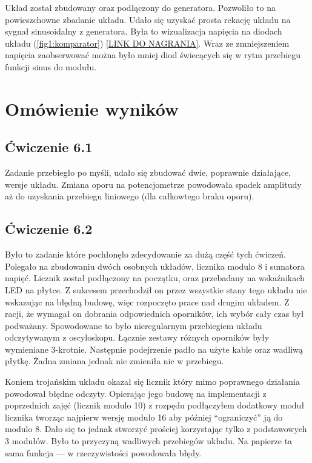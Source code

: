 \documentclass{article}
\begin{document}
      Układ został zbudowany oraz podłączony do generatora. Pozwoliło to na powieszchowne zbadanie układu. Udało się uzyskać prosta rekację układu na sygnał sinusoidalny z generatora. Była to wizualizacja napięcia na diodach układu (\ref{fig1:komparator}) \href{https://youtu.be/hi4uA4t9sUA}{[LINK DO NAGRANIA]}. Wraz ze zmniejszeniem napięcia zaobserwować można było mniej diod świecących się w rytm przebiegu funkcji sinus do modułu.
      

  \section{Omówienie wyników}
    \subsection{Ćwiczenie 6.1}
      Zadanie przebiegło po myśli, udało się zbudować dwie, poprawnie działające, wersje układu. Zmiana oporu na potencjometrze powodowała spadek amplitudy aż do uzyskania przebiegu liniowego (dla całkowtego braku oporu).
    \subsection{Ćwiczenie 6.2}
      Było to zadanie które pochłonęło zdecydowanie za dużą część tych ćwiczeń. Polegało na zbudowaniu dwóch osobnych układów, licznika modulo 8 i sumatora napięć. Licznik został podłączony na początku, oraz przebadany na wskaźnikach LED na płytce. Z sukcesem przechodził on przez wszystkie stany tego układu nie wskazując na błędną budowę, więc rozpoczęto prace nad drugim układem. Z racji, że wymagał on dobrania odpowiednich oporników, ich wybór cały czas był podważany. Spowodowane to było nieregularnym przebiegiem układu odczytywanym z oscyloskopu. Łącznie zestawy różnych oporników były wymieniane 3-krotnie. Następnie podejrzenie padło na użyte kable oraz wadliwą płytkę. Żadna zmiana jednak nie zmieniła nic w przebiegu. 
      
      Koniem trojańskim układu okazał się licznik który mimo poprawnego działania powodował błędne odczyty. Opierając jego budowę na implementacji z poprzednich zajęć (licznik modulo 10) z rozpędu podłączyłem dodatkowy moduł licznika tworząc najpierw wersję modulo 16 aby później ``ograniczyć'' ją do modulo 8. Dało się to jednak stworzyć prościej korzystając tylko z podstawowych 3 modułów. Było to przyczyną wadliwych przebiegów układu. Na papierze ta sama funkcja --- w rzeczywistości powodowała błędy.
\end{document}
